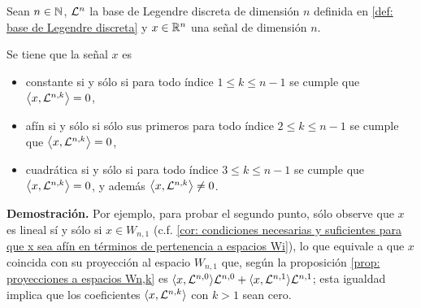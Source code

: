 \begin{prop} 
\label{prop: condiciones necesarias y suficientes sobre la forma de x en terminos de los espacios Wi}
Sean $n \in \mathbb{N}$, $\mathcal{L}^{n}$
la base de Legendre discreta de dimensión $n$
definida en 
\ref{def: base de Legendre discreta} y
$x \in \mathbb{R}^{n}$ una señal de dimensión $n$. 

\noindent
Se tiene que la señal $x$ es
 
\begin{itemize}
\item constante si y sólo si para todo índice
$1 \leq k \leq n-1$ se cumple que $\left\langle x, \mathcal{L}^{n,k} \right\rangle=0$,

\item afín si y sólo si sólo sus primeros
para todo índice
$2 \leq k \leq n-1$ se cumple que $\left\langle x, \mathcal{L}^{n,k} \right\rangle=0$,

\item cuadrática si y sólo si 
para todo índice
$3 \leq k \leq n-1$ se cumple que $\left\langle x, \mathcal{L}^{n,k} \right\rangle=0$,
y además $\left\langle x, \mathcal{L}^{n,k} \right\rangle \neq 0$.
\end{itemize} 

\end{prop}
\noindent
\textbf{Demostración.}
Por ejemplo, para probar el segundo punto, sólo observe que
$x$ es lineal sí y sólo si $x \in W_{n,1}$
(c.f. \ref{cor: condiciones necesarias y suficientes para que x sea afín en términos de pertenencia a espacios Wi}), 
lo que equivale a que $x$ coincida con su proyección
al espacio $W_{n,1}$ que, según la proposición
\ref{prop: proyecciones a espacios Wn,k}
es $\langle x, \mathcal{L}^{n,0} \rangle \mathcal{L}^{n,0} + 
\langle x, \mathcal{L}^{n,1} \rangle \mathcal{L}^{n,1}$; esta igualdad 
implica que los coeficientes $\langle x, \mathcal{L}^{n,k} \rangle$
con $k >1$ sean cero. \QEDB
\vspace{0.2cm}




